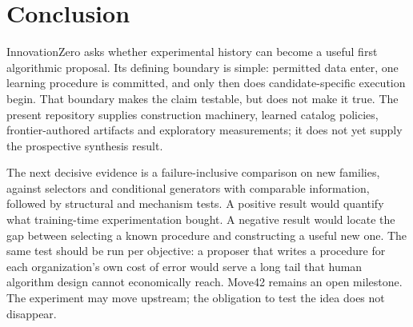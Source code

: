 \section{Conclusion}
\label{sec:conclusion}

InnovationZero asks whether experimental history can become a useful first
algorithmic proposal. Its defining boundary is simple: permitted data enter,
one learning procedure is committed, and only then does candidate-specific
execution begin. That boundary makes the claim testable, but does not make
it true. The present repository supplies construction machinery, learned
catalog policies, frontier-authored artifacts and exploratory measurements;
it does not yet supply the prospective synthesis result.

The next decisive evidence is a failure-inclusive comparison on new
families, against selectors and conditional generators with comparable
information, followed by structural and mechanism tests. A positive result
would quantify what training-time experimentation bought. A negative result
would locate the gap between selecting a known procedure and constructing
a useful new one. The same test should be run per objective: a proposer
that writes a procedure for each organization's own cost of error would
serve a long tail that human algorithm design cannot economically reach.
Move42 remains an open milestone. The experiment may move upstream; the
obligation to test the idea does not disappear.
